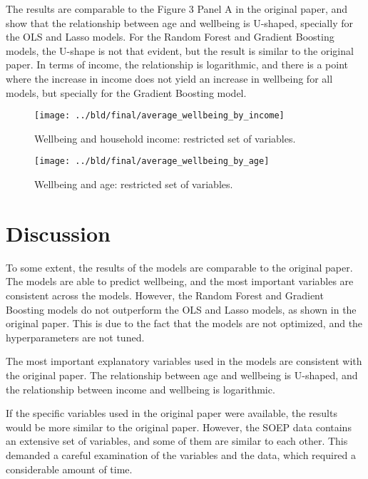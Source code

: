\documentclass[11pt, a4paper, leqno]{article}
\begin{document}
The results are comparable to the Figure 3 Panel A in the original paper, and show that the
relationship between age and wellbeing is U-shaped, specially for the OLS and Lasso models.
For the Random Forest and Gradient Boosting models, the U-shape is not that evident, but the result
is similar to the original paper. In terms of income, the relationship is logarithmic, and there
is a point where the increase in income does not yield an increase in wellbeing for all models,
but specially for the Gradient Boosting model.

\begin{figure}[htbp]
    \centering
    \texttt{[image: ../bld/final/average\_wellbeing\_by\_income]}
    \caption{Wellbeing and household income: restricted set of variables.}
    \label{fig:average_wellbeing_by_income}
\end{figure}

\begin{figure}[htbp]
    \centering
    \texttt{[image: ../bld/final/average\_wellbeing\_by\_age]}
    \caption{Wellbeing and age: restricted set of variables.}
    \label{fig:average_wellbeing_by_age}
\end{figure}



\section{Discussion} %
\label{sec:discussion}

To some extent, the results of the models are comparable to the original paper. The models
are able to predict wellbeing, and the most important variables are consistent across the
models. However, the Random Forest and Gradient Boosting models do not outperform the OLS
and Lasso models, as shown in the original paper. This is due to the fact that the models
are not optimized, and the hyperparameters are not tuned.

The most important explanatory variables used in the models are consistent with the original paper.
The relationship between age and wellbeing is U-shaped, and the relationship between income and
wellbeing is logarithmic.

If the specific variables used in the original paper were available, the results would be
more similar to the original paper. However, the SOEP data contains an extensive set of variables,
and some of them are similar to each other. This demanded a careful examination of the variables
and the data, which required a considerable amount of time.






\printbibliography
{}



\end{document}
